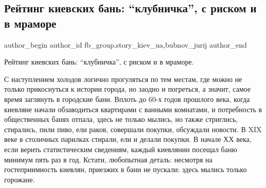  
 
 
 
 
 
\subsection{Рейтинг киевских бань: \enquote{клубничка}, с риском и в мраморе}
\label{sec:22_12_2021.fb.fb_group.story_kiev_ua.1.kiev_bani_rejting}
 
\ifcmt
 author_begin
   author_id fb_group.story_kiev_ua,bubnov_jurij
 author_end
\fi

Рейтинг киевских бань: \enquote{клубничка}, с риском и в мраморе.

С наступлением холодов логично прогуляться по тем местам, где можно не только
прикоснуться к истории города, но заодно и погреться, а значит, самое время
заглянуть в городские бани. Вплоть до 60-х годов прошлого века, когда киевляне
начали обзаводиться квартирами с ванными комнатами, и потребность в
общественных банях отпала, здесь не только мылись, но также стриглись,
стирались, пили пиво, ели раков, совершали покупки, обсуждали новости. В XIX
веке в столичных парилках стирали, ели и делали покупки. В начале ХХ века, если
верить статистическим сведениям, каждый киевлянин посещал баню минимум пять раз
в год. Кстати, любопытная деталь: несмотря на гостеприимность киевлян, приезжих
в бани не пускали: здесь мылись только горожане.

\begin{multicols}{2} %
\setlength{\parindent}{0pt}


\end{multicols} %

